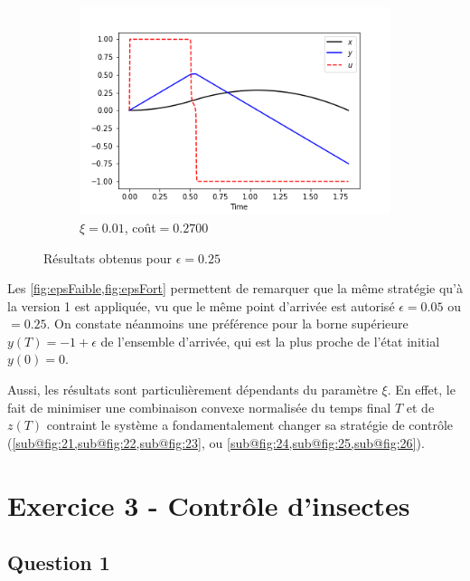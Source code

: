 \documentclass[
	french,
	11pt, %
]{fphw}
\begin{document}
\begin{figure}[H]
\begin{subfigure}[b]{0.32\textwidth}
        \includegraphics[width=\textwidth]{Exo26.png}
        \caption{$\xi = 0.01$, coût$=0.2700$}
        \label{fig:26}
    \end{subfigure}
       \caption{Résultats obtenus pour $\epsilon= 0.25$}
       \label{fig:epsFort}
\end{figure}

Les \cref{fig:epsFaible,fig:epsFort} permettent de remarquer que la même stratégie qu'à la version 1 est appliquée, vu que le même point d'arrivée est autorisé $\epsilon = 0.05$ ou $= 0.25$. On constate néanmoins une préférence pour la borne supérieure $y(T)=-1+\epsilon$ de l'ensemble d'arrivée, qui est la plus proche de l'état initial $y(0)=0$. 

Aussi, les résultats sont particulièrement dépendants du paramètre $\xi$. En effet, le fait de minimiser une combinaison convexe normalisée du temps final $T$ et de $z(T)$ contraint le système a fondamentalement changer sa stratégie de contrôle (\cref{sub@fig:21,sub@fig:22,sub@fig:23}, ou \cref{sub@fig:24,sub@fig:25,sub@fig:26}).





\clearpage





\section*{Exercice 3 - Contrôle d'insectes}

\subsection*{Question 1}
\end{document}
